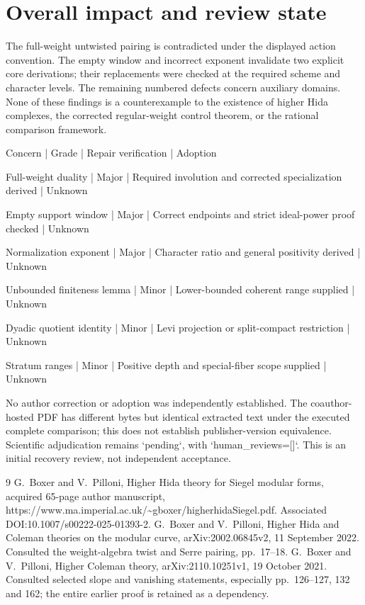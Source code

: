 \documentclass[10pt]{article}
\begin{document}
\section*{Overall impact and review state}
The full-weight untwisted pairing is contradicted under the displayed action convention. The empty window and incorrect exponent invalidate two explicit core derivations; their replacements were checked at the required scheme and character levels. The remaining numbered defects concern auxiliary domains. None of these findings is a counterexample to the existence of higher Hida complexes, the corrected regular-weight control theorem, or the rational comparison framework.\par
Concern | Grade | Repair verification | Adoption\par
Full-weight duality | Major | Required involution and corrected specialization derived | Unknown\par
Empty support window | Major | Correct endpoints and strict ideal-power proof checked | Unknown\par
Normalization exponent | Major | Character ratio and general positivity derived | Unknown\par
Unbounded finiteness lemma | Minor | Lower-bounded coherent range supplied | Unknown\par
Dyadic quotient identity | Minor | Levi projection or split-compact restriction | Unknown\par
Stratum ranges | Minor | Positive depth and special-fiber scope supplied | Unknown\par
No author correction or adoption was independently established. The coauthor-hosted PDF has different bytes but identical extracted text under the executed complete comparison; this does not establish publisher-version equivalence. Scientific adjudication remains `pending`, with `human\_reviews=[]`. This is an initial recovery review, not independent acceptance.\par
9 G. Boxer and V. Pilloni, Higher Hida theory for Siegel modular forms, acquired 65-page author manuscript, https://www.ma.imperial.ac.uk/\textasciitilde{}gboxer/higherhidaSiegel.pdf. Associated DOI:10.1007/s00222-025-01393-2. G. Boxer and V. Pilloni, Higher Hida and Coleman theories on the modular curve, arXiv:2002.06845v2, 11 September 2022. Consulted the weight-algebra twist and Serre pairing, pp. 17–18. G. Boxer and V. Pilloni, Higher Coleman theory, arXiv:2110.10251v1, 19 October 2021. Consulted selected slope and vanishing statements, especially pp. 126–127, 132 and 162; the entire earlier proof is retained as a dependency.\par
\end{document}
